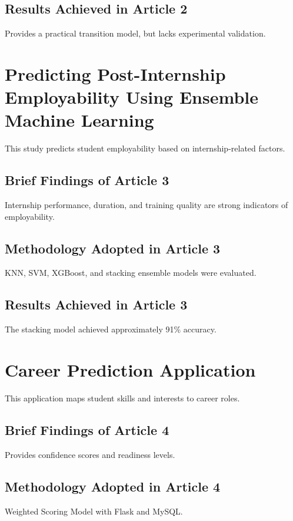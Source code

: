 \documentclass[12pt,a4paper]{report}
\begin{document}
\subsection{Results Achieved in Article 2}
Provides a practical transition model, but lacks experimental validation.

\section{Predicting Post-Internship Employability Using Ensemble Machine Learning}
\cite{kahlik2024predicting}
\par
This study predicts student employability based on internship-related factors.

\subsection{Brief Findings of Article 3}
Internship performance, duration, and training quality are strong indicators of employability.

\subsection{Methodology Adopted in Article 3}
KNN, SVM, XGBoost, and stacking ensemble models were evaluated.

\subsection{Results Achieved in Article 3}
The stacking model achieved approximately 91\% accuracy.

\section{Career Prediction Application}
\cite{garje2026career}
\par
This application maps student skills and interests to career roles.

\subsection{Brief Findings of Article 4}
Provides confidence scores and readiness levels.

\subsection{Methodology Adopted in Article 4}
Weighted Scoring Model with Flask and MySQL.
\end{document}
